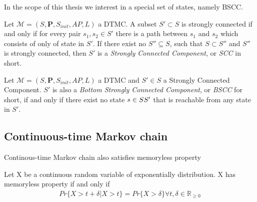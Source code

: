 In the scope of this thesis we interest in a special set of states, namely BSCC.
\begin{definition}
    Let $\mathcal{M}=(S,\mathbf{P}, S_{init}, AP,L)$ a DTMC. A subset $S'\subset
        S$ is strongly connected if and only if for every pair $s_1,s_2\in S'$ there
    is a path between $s_1$ and $s_2$ which consists of only of state in $S'$. If
    there exist no $S''\subseteq S$, such that $S\subset S''$ and $S''$ is
    strongly connected, then $S'$ is a \textit{Strongly Connected Component}, or
    \textit{SCC} in short.
\end{definition}

\begin{definition}
    Let $\mathcal{M}=(S,\mathbf{P}, S_{init}, AP,L)$ a DTMC and $S'\in S$ a
    Strongly Connected Component. $S'$ is also a \textit{Bottom Strongly Connected
        Component}, or \textit{BSCC} for short, if and only if there exist no state
    $s \in S\\S'$ that is reachable from any state in $S'$.
\end{definition}

\subsection{Continuous-time Markov chain}
Continous-time Markov chain also satisfies memoryless property
\begin{definition}
    Let X be a continuous random variable of exponentially distribution. X has memoryless property
    if and only if
    \begin{align*}
        Pr\{X > t + \delta | X > t\} = Pr\{X > \delta\} \forall t,\delta\in\mathbb{R}_{\geq 0}
    \end{align*}
\end{definition}


